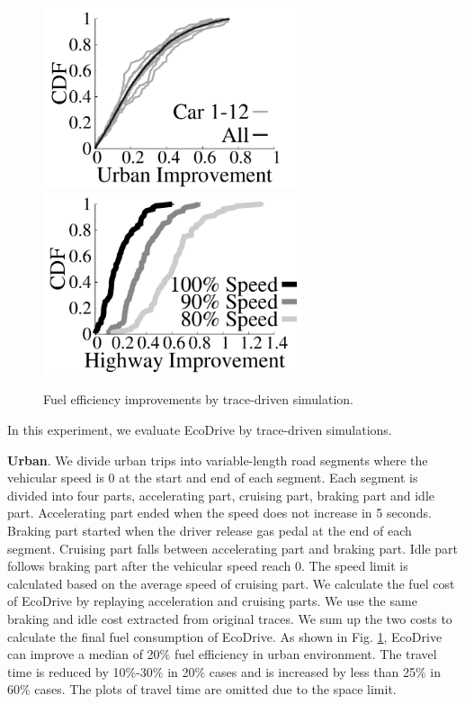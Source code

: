 \begin{figure}[!htbp]
\begin{center}
\includegraphics[width=3.0in,angle=0]{Figs/EcoDrive/evaluation/urban_cdf_all.pdf}
\hspace{-0.5cm}
\includegraphics[width=3.0in,angle=0]{Figs/EcoDrive/evaluation/hwy_improve_cdf.pdf}
\vspace{-0.2cm}
\caption{Fuel efficiency improvements by trace-driven simulation.}
\vspace{-0.6cm}
\label{tracedriven}
\end{center}
\end{figure}

In this experiment, we evaluate EcoDrive by trace-driven simulations. 

\textbf{Urban}. We divide urban trips into variable-length road segments 
where the vehicular speed is 0 at the start and end of each segment. 
Each segment is divided into four parts, accelerating part, cruising part, 
braking part and idle part. 
Accelerating part ended when the speed does not increase in 5 seconds. 
Braking part started when the driver release gas pedal at the end of each segment. 
Cruising part falls between accelerating part and braking part.
Idle part follows braking part after the vehicular speed reach 0.  
The speed limit is calculated based on the average speed of cruising part. 
We calculate the fuel cost of EcoDrive by replaying acceleration and cruising parts.
We use the same braking and idle cost extracted from original traces.
We sum up the two costs to calculate the final fuel consumption of EcoDrive. 
As shown in Fig. \ref{tracedriven}, EcoDrive can improve a median of 
20\% fuel efficiency in urban environment. 
The travel time is reduced by 10\%-30\% in 20\% cases and is increased
by less than 25\% in 60\% cases. 
The plots of travel time are omitted due to the space limit.   

